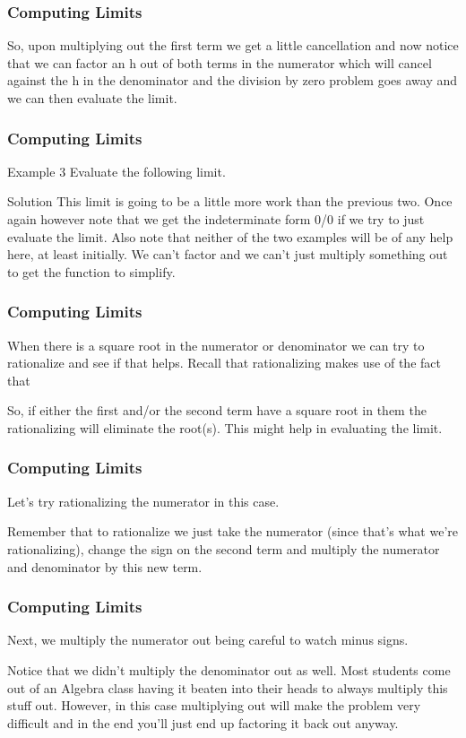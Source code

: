 \documentclass{beamer}
\begin{document}
\begin{frame}[fragile]
	\frametitle{Computing Limits}
	\Large

So, upon multiplying out the first term we get a little cancellation and now notice that we can factor an h out of both terms in the numerator which will cancel against the h in the denominator and the division by zero problem goes away and we can then evaluate the limit.

\end{frame}
\begin{frame}[fragile]
	\frametitle{Computing Limits}
	\Large
Example 3  Evaluate the following limit.

Solution
This limit is going to be a little more work than the previous two.  Once again however note that we get the indeterminate form 0/0 if we try to just evaluate the limit.  Also note that neither of the two examples will be of any help here, at least initially.  We can’t factor and we can’t just multiply something out to get the function to simplify.
\end{frame}
\begin{frame}[fragile]
	\frametitle{Computing Limits}
	\Large
When there is a square root in the numerator or denominator we can try to rationalize and see if that helps.  Recall that rationalizing makes use of the fact that

So, if either the first and/or the second term have a square root in them the rationalizing will eliminate the root(s).  This might help in evaluating the limit.
\end{frame}
\begin{frame}[fragile]
	\frametitle{Computing Limits}
	\Large

Let’s try rationalizing the numerator in this case. 

Remember that to rationalize we just take the numerator (since that’s what we’re rationalizing), change the sign on the second term and multiply the numerator and denominator by this new term.
\end{frame}
\begin{frame}[fragile]
	\frametitle{Computing Limits}
	\Large
Next, we multiply the numerator out being careful to watch minus signs.


Notice that we didn’t multiply the denominator out as well.  Most students come out of an Algebra class having it beaten into their heads to always multiply this stuff out.  However, in this case multiplying out will make the problem very difficult and in the end you’ll just end up factoring it back out anyway.
\end{frame}
\end{document}
